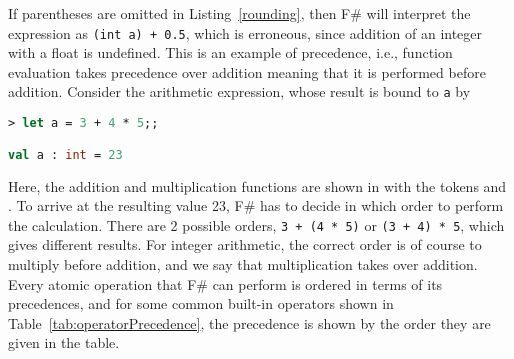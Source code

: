 If parentheses are omitted in Listing~\ref{rounding}, then F\# will interpret the expression as \lstinline|(int a) + 0.5|, which is erroneous, since addition of an integer with a float is undefined. This is an example of precedence, i.e., function evaluation takes precedence over addition meaning that it is performed before addition. Consider the arithmetic expression, whose result is bound to \lstinline|a| by
%
\begin{lstlisting}[language=fsharp,caption={fsharpi, a simple arithmetic expression.}]
> let a = 3 + 4 * 5;;

val a : int = 23
\end{lstlisting}
Here, the addition and multiplication functions are shown in  with the  tokens \token{+} and \token{*}. To arrive at the resulting value 23, F\# has to decide in which order to perform the calculation. There are 2 possible orders, \lstinline|3 + (4 * 5)| or \lstinline|(3 + 4) * 5|, which gives different results. For integer arithmetic, the correct order is of course to multiply before addition, and we say that multiplication takes  over addition. Every atomic operation that F\# can perform is ordered in terms of its precedences, and for some common built-in operators shown in Table~\ref{tab:operatorPrecedence}, the precedence is shown by the order they are given in the table.
